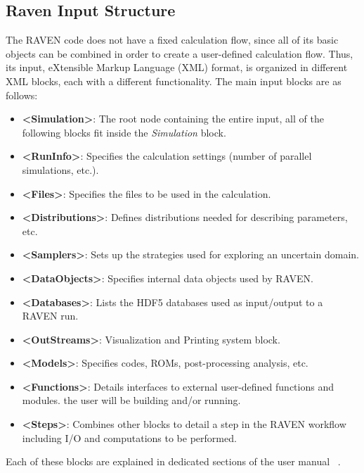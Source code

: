 \subsection{Raven Input Structure}
\label{sub:InputStructure}
The RAVEN code does not have a fixed calculation flow, since all of its basic
objects can be combined in order to create a user-defined calculation flow.
%
Thus, its input, eXtensible Markup Language (XML) format, is organized in different XML blocks, each with a
different functionality.
%
The main input blocks are as follows:
\begin{itemize}
  \item \textbf{\textless Simulation\textgreater}: The root node containing the
  entire input, all of
  the following blocks fit inside the \emph{Simulation} block.
  \item \textbf{\textless RunInfo\textgreater}: Specifies the calculation
  settings (number of parallel simulations, etc.).
  \item \textbf{\textless Files\textgreater}: Specifies the files to be
  used in the calculation.
  \item \textbf{\textless Distributions\textgreater}: Defines distributions
  needed for describing parameters, etc.
  \item \textbf{\textless Samplers\textgreater}: Sets up the strategies used for
  exploring an uncertain domain.
  \item \textbf{\textless DataObjects\textgreater}: Specifies internal data objects
  used by RAVEN.
  \item \textbf{\textless Databases\textgreater}: Lists the HDF5 databases used
  as input/output to a
  RAVEN run.
  \item \textbf{\textless OutStreams\textgreater}: Visualization and
  Printing system block.
  \item \textbf{\textless Models\textgreater}: Specifies codes, ROMs,
  post-processing analysis, etc.
  \item \textbf{\textless Functions\textgreater}: Details interfaces to external
  user-defined functions and modules.
  the user will be building and/or running.
  \item \textbf{\textless Steps\textgreater}: Combines other blocks to detail a
  step in the RAVEN workflow including I/O and computations to be performed.
\end{itemize}

Each of these blocks are explained in dedicated sections of the user manual ~\cite{RAVENuserManual}.
%

